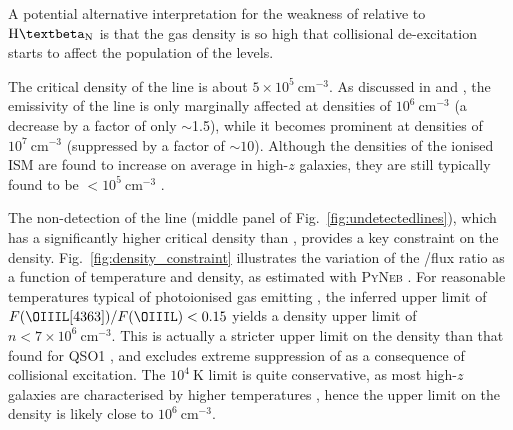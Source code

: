 \documentclass[fleqn,usenatbib]{mnras}
\newcommand{\Hbeta}{\text{H\textbeta}\xspace}
\begin{document}
A potential alternative interpretation for the weakness of \OIIIL relative to $\Hbeta_\mathrm{N}$ is that the gas density is so high that collisional de-excitation starts to affect the population of the \OIIIL levels. 

The critical density of the \OIIIL line is about $5\times 10^5~\mathrm{cm}^{-3}$. As discussed in \citet{Martinez2025} and \citet{Maiolino2025_QSO1}, the emissivity of the \OIIIL line is only marginally affected at densities of $10^6~\mathrm{cm}^{-3}$ (a decrease by a factor of only $\sim$1.5), while it becomes prominent at densities of $10^7~\mathrm{cm}^{-3}$ (suppressed by a factor of $\sim 10$).
Although the densities of the ionised ISM are found to increase on average in high-$z$ galaxies, they are still typically found to be $<10^5 \ \mathrm{cm}^{-3}$ \citep[][]{Isobe2023, Topping2025}.


The non-detection of the \OIIIL[4363] line (middle panel of Fig.~\ref{fig:undetectedlines}), which has a significantly higher critical density than \OIIIL, provides a key constraint on the density. 
Fig.~\ref{fig:density_constraint} illustrates the variation of the \OIIIL[4363]/\OIIIL flux ratio as a function of temperature and density, as estimated with \textsc{PyNeb} \citep{Luridiana2015_PyNeb}. 
For reasonable temperatures typical of photoionised gas emitting \Hbeta \citep[$T > 10^4 \ \mathrm{K}$, e.g.][]{Osterbrock2006}, the inferred upper limit of $F(\OIIIL[4363])/F(\OIIIL)<0.15$ yields a density upper limit of $n<7\times10^6 \ \mathrm{cm}^{-3}$. 
This is actually a stricter upper limit on the density than that found for QSO1 \citep[$n<10^7 \ \mathrm{cm}^{-3}$;][]{Maiolino2025_QSO1}, and excludes extreme suppression of \OIIIL as a consequence of collisional excitation. The $10^4~\mathrm{K}$ limit is quite conservative, as most high-$z$ galaxies are characterised by higher temperatures \citep{Sanders2025,Cataldi2025}, hence the upper limit on the density is likely close to $10^6~\mathrm{cm}^{-3}$.


\end{document}
